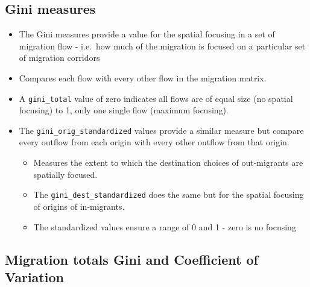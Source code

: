 \documentclass[
]{book}
\providecommand{\tightlist}{%
  \setlength{\itemsep}{0pt}\setlength{\parskip}{0pt}}
\begin{document}
\hypertarget{gini-measures}{%
\subsection{Gini measures}\label{gini-measures}}

\begin{itemize}
\tightlist
\item
  The Gini measures provide a value for the spatial focusing in a set of migration flow - i.e.~how much of the migration is focused on a particular set of migration corridors
\item
  Compares each flow with every other flow in the migration matrix.
\item
  A \texttt{gini\_total} value of zero indicates all flows are of equal size (no spatial focusing) to 1, only one single flow (maximum focusing).
\item
  The \texttt{gini\_orig\_standardized} values provide a similar measure but compare every outflow from each origin with every other outflow from that origin.

  \begin{itemize}
  \tightlist
  \item
    Measures the extent to which the destination choices of out-migrants are spatially focused.
  \item
    The \texttt{gini\_dest\_standardized} does the same but for the spatial focusing of origins of in-migrants.
  \item
    The standardized values ensure a range of 0 and 1 - zero is no focusing
  \end{itemize}
\end{itemize}

\hypertarget{migration-totals-gini-and-coefficient-of-variation}{%
\subsection{Migration totals Gini and Coefficient of Variation}\label{migration-totals-gini-and-coefficient-of-variation}}
\end{document}
